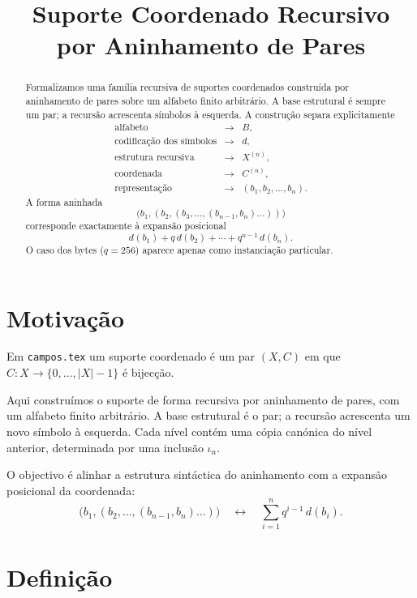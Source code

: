 \documentclass[11pt,a4paper]{article}
\title{Suporte Coordenado Recursivo\\
por Aninhamento de Pares}
\author{}
\date{}
\begin{document}
\maketitle

\begin{abstract}
\noindent
Formalizamos uma família recursiva de suportes coordenados construída por aninhamento de pares sobre um alfabeto finito arbitrário.
A base estrutural é sempre um par; a recursão acrescenta símbolos à esquerda.
A construção separa explicitamente
\[
\begin{array}{rcl}
\text{alfabeto} &\longrightarrow& B,\\
\text{codificação dos símbolos} &\longrightarrow& d,\\
\text{estrutura recursiva} &\longrightarrow& X^{(n)},\\
\text{coordenada} &\longrightarrow& C^{(n)},\\
\text{representação} &\longrightarrow& (b_1,b_2,\dots,b_n).
\end{array}
\]
A forma aninhada
\[
\bigl(b_1,(b_2,(b_3,\dots,(b_{n-1},b_n)\dots))\bigr)
\]
corresponde exactamente à expansão posicional
\[
d(b_1)+q\,d(b_2)+\cdots+q^{n-1}\,d(b_n).
\]
O caso dos bytes (\(q=256\)) aparece apenas como instanciação particular.
\end{abstract}

\section{Motivação}

Em \texttt{campos.tex} um suporte coordenado é um par \((X,C)\) em que \(C\colon X\to\{0,\dots,\lvert X\rvert-1\}\) é bijecção.

Aqui construímos o suporte de forma recursiva por aninhamento de pares, com um alfabeto finito arbitrário.
A base estrutural é o par; a recursão acrescenta um novo símbolo à esquerda.
Cada nível contém uma cópia canónica do nível anterior, determinada por uma inclusão \(\iota_n\).

O objectivo é alinhar a estrutura sintáctica do aninhamento com a expansão posicional da coordenada:
\[
\bigl(b_1,(b_2,\dots,(b_{n-1},b_n)\dots)\bigr)
\quad\longleftrightarrow\quad
\sum_{i=1}^{n} q^{i-1}\,d(b_i).
\]

\section{Definição}
\end{document}
